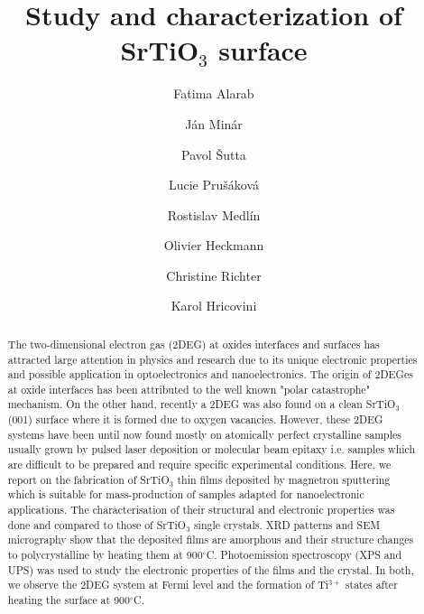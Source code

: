 \documentclass{aip-cp}
\begin{document}
\title{Study and characterization of SrTiO$_{3}$ surface}

\author[aff1,aff2]{Fatima Alarab}
\author[aff2]{J\'an Min\'ar}
\author[aff2]{Pavol \v{S}utta}
\author[aff2]{Lucie Pru\v{s}\'akov\'a}
\author[aff2]{Rostislav Medl\'in}
\author[aff1]{Olivier Heckmann}
\author[aff1]{Christine Richter}
\author[aff1]{Karol Hricovini}




\maketitle
\begin{abstract}
The two-dimensional electron gas (2DEG) at oxides interfaces and surfaces has attracted large attention in physics and research due to its unique electronic properties and possible application in optoelectronics and nanoelectronics. The origin of 2DEGes at oxide interfaces has been attributed to the well known "polar catastrophe" mechanism. On the other
hand, recently a 2DEG was also found on a clean SrTiO$_{3}$(001) surface where it is formed due to oxygen vacancies. However, these 2DEG systems have been until now found mostly on atomically perfect crystalline samples usually grown by pulsed laser deposition or molecular beam epitaxy i.e. samples which are difficult to be prepared and require specific experimental conditions. Here, we report on the fabrication of SrTiO$_{3}$ thin films deposited by magnetron sputtering which is suitable for mass-production of samples adapted for nanoelectronic applications. The characterisation of their structural and electronic properties was done and compared to those of SrTiO$_{3}$ single crystals. XRD patterns and SEM micrography show that the deposited films are amorphous and their structure changes to polycrystalline by heating them at 900$^{\circ}$C. Photoemission spectroscopy (XPS and UPS) was used to study the electronic properties of the films and the crystal. In both, we observe the 2DEG system at Fermi level and the formation of Ti$^{3+}$ states after heating the surface at 900$^{\circ}$C. 
\end{abstract}

\end{document}
